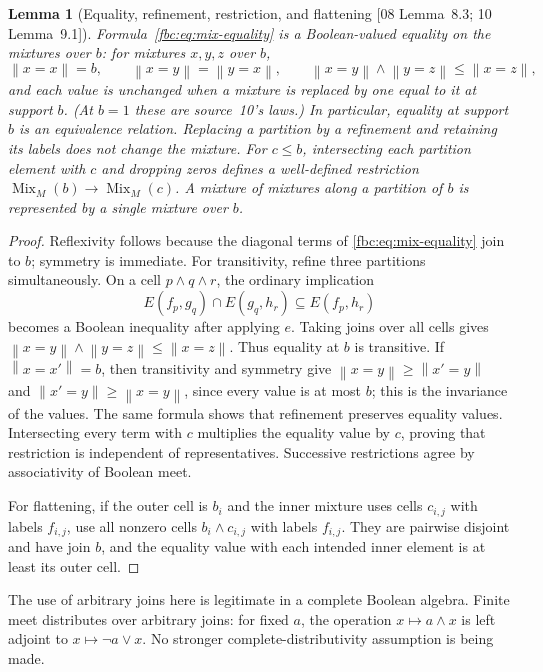 \documentclass[11pt,letterpaper]{article}
\newtheorem{lemma}[theorem]{Lemma}
\theoremstyle{definition}
\theoremstyle{remark}
\newcommand{\Mix}{\operatorname{Mix}}
\newcommand{\eqset}[2]{E(#1,#2)}
\newcommand{\truth}[1]{\left\lVert #1\right\rVert}
\newcommand{\src}[1]{\textup{[#1]}}
\begin{document}
\begin{lemma}[Equality, refinement, restriction, and flattening \src{08 Lemma~8.3; 10 Lemma~9.1}]
\label{fbc:lem:mix-well-defined}
Formula~\eqref{fbc:eq:mix-equality} is a Boolean-valued equality on the
mixtures over $b$: for mixtures $x,y,z$ over $b$,
\[
 \truth{x=x}=b,\qquad \truth{x=y}=\truth{y=x},\qquad
 \truth{x=y}\wedge\truth{y=z}\leq\truth{x=z},
\]
and each value is unchanged when a mixture is replaced by one equal to
it at support $b$. \textup{(At $b=1$ these are source~10's laws.)} In
particular, equality at support $b$ is an equivalence relation. Replacing a
partition by a refinement and retaining its labels does not change
the mixture. For $c\leq b$, intersecting each partition element
with $c$ and dropping zeros defines a well-defined restriction
$\Mix_M(b)\to\Mix_M(c)$. A mixture of mixtures along a partition of $b$
is represented by a single mixture over $b$.
\end{lemma}
\begin{proof}
Reflexivity follows because the diagonal terms of
\eqref{fbc:eq:mix-equality} join to $b$; symmetry is immediate.
For transitivity, refine three partitions simultaneously. On a
cell $p\wedge q\wedge r$, the ordinary implication
\[
 \eqset{f_p}{g_q}\cap\eqset{g_q}{h_r}
       \subseteq\eqset{f_p}{h_r}
\]
becomes a Boolean inequality after applying $e$. Taking joins over
all cells gives
$\truth{x=y}\wedge\truth{y=z}\leq\truth{x=z}$.
Thus equality at $b$ is transitive. If $\truth{x=x'}=b$, then
transitivity and symmetry give $\truth{x=y}\geq\truth{x'=y}$ and
$\truth{x'=y}\geq\truth{x=y}$, since every value is at most $b$; this is
the invariance of the values. The same formula shows that
refinement preserves equality values. Intersecting every term with
$c$ multiplies the equality value by $c$, proving that restriction
is independent of representatives. Successive restrictions agree
by associativity of Boolean meet.

For flattening, if the outer cell is $b_i$ and the inner mixture uses
cells $c_{i,j}$ with labels $f_{i,j}$, use all nonzero cells
$b_i\wedge c_{i,j}$ with labels $f_{i,j}$. They are pairwise disjoint
and have join $b$, and the equality value with each intended inner
element is at least its outer cell.
\end{proof}

The use of arbitrary joins here is legitimate in a complete Boolean
algebra. Finite meet distributes over arbitrary joins: for fixed
$a$, the operation $x\mapsto a\wedge x$ is left adjoint to
$x\mapsto\neg a\vee x$. No stronger complete-distributivity
assumption is being made.
\end{document}
